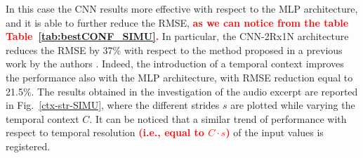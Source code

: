\documentclass[review]{elsarticle}
\newcommand{\figref}[1]{Fig.~\ref{#1}}
\newcommand{\tableref}[1]{Table~\ref{#1}}
\begin{document}
In this case the CNN results more effective with respect to the MLP architecture, and it is able to further reduce the RMSE,
\textcolor{red}{\textbf{as we can notice from the table \tableref{tab:bestCONF_SIMU}.}}
In particular, the CNN-2Rx1N architecture reduces the RMSE by 37\% with respect to the method proposed in a previous work by the authors \cite{vesperini2016sloc}.
Indeed, the introduction of a temporal context improves the performance also with the MLP architecture, with RMSE reduction equal to 21.5\%.
The  results obtained in the investigation of the audio excerpt are reported in \figref{ctx-str-SIMU}, where the different strides $s$ are plotted while varying the temporal context $C$. %
It can be noticed that a similar trend of performance with respect to temporal resolution \textcolor{red}{\textbf{(i.e., equal to $C\cdot s$)}} of the input values is registered.
\end{document}
